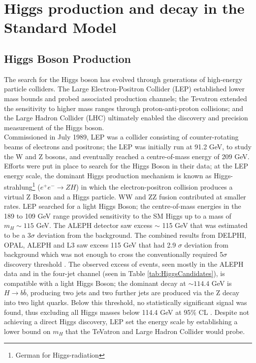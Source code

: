 \documentclass[a4paper,11pt]{article}
\begin{document}
	\section{Higgs production and decay in the Standard Model}
	
	\subsection{Higgs Boson Production} 
	The search for the Higgs boson has evolved through generations of high-energy particle colliders. The Large Electron-Positron Collider (LEP) established lower mass bounds and probed associated production channels; the Tevatron extended the sensitivity to higher mass ranges through proton-anti-proton collisions; and the Large Hadron Collider (LHC) ultimately enabled the discovery and precision measurement of the Higgs boson.\\
	
Commissioned in July 1989, LEP was a collider consisting of counter-rotating beams of electrons and positrons;  the LEP was initially run at 91.2 GeV, to study the W and Z bosons, and eventually reached a centre-of-mass energy of 209 GeV. Efforts were put in place to search for the Higgs Boson in their data; at the LEP energy scale, the dominant Higgs production mechanism is known as Higgs-strahlung\footnote{German for Higgs-radiation} ($e^+e^- \rightarrow ZH$) in which the electron-positron collision produces a virtual Z Boson and a Higgs particle. WW and ZZ fusion contributed at smaller rates. LEP searched for a light Higgs Boson; the centre-of-mass energies in the 189 to 109 GeV range provided sensitivity to the SM Higgs up to a mass of $m_H \sim 115$ GeV\cite{Raspereza:2002ni}. The ALEPH detector saw excess $\sim$ 115 GeV that was estimated to be a 3$\sigma$ deviation from the background. The combined results from DELPHI, OPAL, ALEPH and L3 saw excess 115 GeV that had 2.9 $\sigma$ deviation from background which was not enough to cross the conventionally required 5$\sigma$ discovery threshold \cite{Mori:2001qow}. The observed excess of events, seen mostly in the ALEPH data and in the four-jet channel (seen in Table \ref{tab:HiggsCandidates}), is compatible with a light Higgs Boson; the dominant decay at $\sim 114.4$ GeV is $H \rightarrow b\bar{b}$, producing two jets and two further jets are produced via the Z decay into two light quarks. Below this threshold, no statistically significant signal was found, thus excluding all Higgs masses below 114.4 GeV at 95\% CL \cite{Raspereza:2002ni}. Despite not achieving a direct Higgs discovery, LEP set the energy scale by establishing a lower bound on $m_H$ that the TeVatron and Large Hadron Collider would probe.\\
\end{document}
